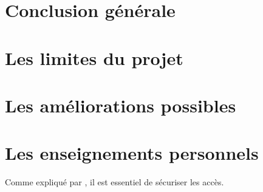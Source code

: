 \section{Conclusion générale}


\section{Les limites du projet}


\section{Les améliorations possibles}


\section{Les enseignements personnels}



Comme expliqué par \cite{example-reference}, il est essentiel de sécuriser les accès.
